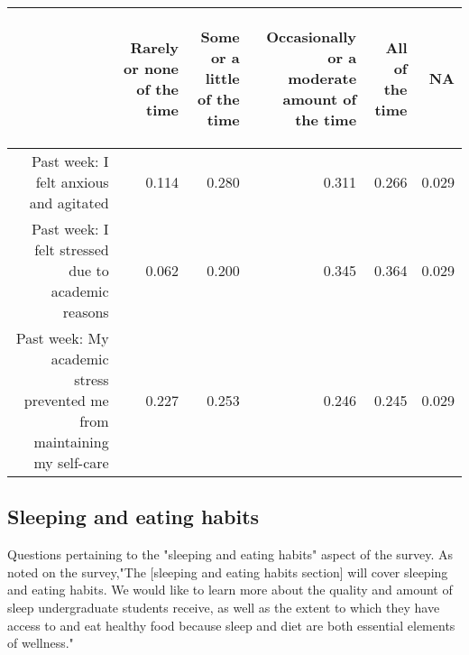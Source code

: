 \documentclass{article}\usepackage[]{graphicx}\usepackage[]{color}
\begin{document}
\begin{table}[ht]
\centering
\begin{tabular}{rrrrrr}
  \hline
 & \begin{sideways} Rarely or none of the time \end{sideways} & \begin{sideways} Some or a little of the time \end{sideways} & \begin{sideways} Occasionally or a moderate amount of the time \end{sideways} & \begin{sideways} All of the time \end{sideways} & \begin{sideways} NA \end{sideways} \\ 
  \hline
Past week: I felt anxious and agitated & 0.114 & 0.280 & 0.311 & 0.266 & 0.029 \\ 
  	Past week: I felt stressed due to academic reasons & 0.062 & 0.200 & 0.345 & 0.364 & 0.029 \\ 
  Past week: My academic stress prevented me from maintaining my self-care & 0.227 & 0.253 & 0.246 & 0.245 & 0.029 \\ 
   \hline
\end{tabular}
\end{table}


\newpage 

\subsection{Sleeping and eating habits}
Questions pertaining to the "sleeping and eating habits" aspect of the survey. As noted on the survey,"The [sleeping and eating habits section] will cover sleeping and eating habits.  We would like to
learn more about the quality and amount of sleep undergraduate students receive,
as well as the extent to which they have access to and eat healthy food because
sleep and diet are both essential elements of wellness."
\end{document}
